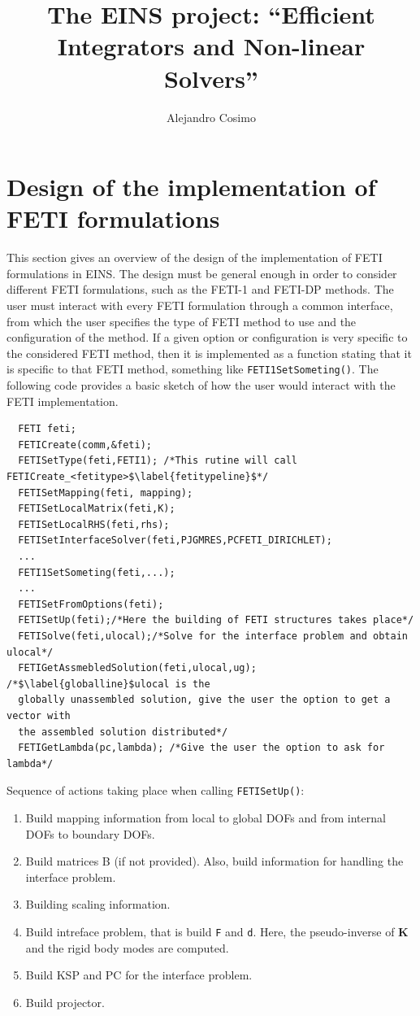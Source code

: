 \documentclass[a4paper,11pt]{report}
\begin{document}
\title{\color{blue}The EINS project: ``Efficient Integrators and
  Non-linear Solvers''}
\author{Alejandro Cosimo}

\maketitle
\tableofcontents

\chapter{Design of the implementation of FETI formulations}

This section gives an overview of the design of the implementation of
FETI formulations in EINS. The design must be general enough in order
to consider different FETI formulations, such as the FETI-1 and
FETI-DP methods. The user must interact with every FETI formulation
through a common interface, from
which the user specifies the type of FETI method to use and the
configuration of the method. If a given option or configuration is
very specific to the considered FETI method, then it is implemented as
a function stating that it is specific to that FETI method, something
like \verb!FETI1SetSometing()!. The following code provides a basic
sketch of how the user would interact with the FETI implementation.


\begin{verbatim}
  FETI feti;
  FETICreate(comm,&feti);
  FETISetType(feti,FETI1); /*This rutine will call FETICreate_<fetitype>$\label{fetitypeline}$*/
  FETISetMapping(feti, mapping);
  FETISetLocalMatrix(feti,K);
  FETISetLocalRHS(feti,rhs);
  FETISetInterfaceSolver(feti,PJGMRES,PCFETI_DIRICHLET);
  ...
  FETI1SetSometing(feti,...);
  ...
  FETISetFromOptions(feti);
  FETISetUp(feti);/*Here the building of FETI structures takes place*/
  FETISolve(feti,ulocal);/*Solve for the interface problem and obtain ulocal*/
  FETIGetAssmebledSolution(feti,ulocal,ug); /*$\label{globalline}$ulocal is the
  globally unassembled solution, give the user the option to get a vector with
  the assembled solution distributed*/
  FETIGetLambda(pc,lambda); /*Give the user the option to ask for lambda*/
\end{verbatim}

\noindent Sequence of actions taking place when calling \verb!FETISetUp()!:
\begin{enumerate}[noitemsep,topsep=2pt,parsep=2pt,partopsep=2pt]
\item Build mapping information from local to global DOFs and from
  internal DOFs to boundary DOFs.
\item Build matrices B (if not provided). Also, build information for
  handling the interface problem.
\item Building scaling information.
\item Build intreface problem, that is build \verb!F! and
  \verb!d!. Here, the pseudo-inverse of $\bm{K}$ and the rigid body
  modes are computed.
\item Build KSP and PC for the interface problem.
\item Build projector.
\end{enumerate}
\end{document}
